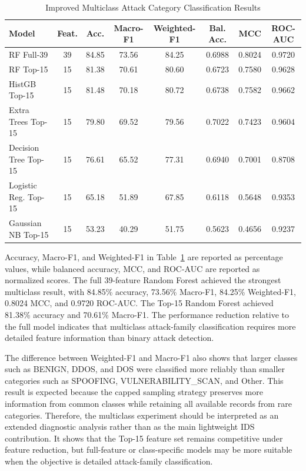 \documentclass[journal]{IEEEtran}
\begin{document}
\begin{table}[htbp]
\caption{Improved Multiclass Attack Category Classification Results}
\label{tab:multiclass_results}
\centering
\scriptsize
\begin{tabular}{lccccccc}
\toprule
\textbf{Model} & \textbf{Feat.} & \textbf{Acc.} & \textbf{Macro-F1} & \textbf{Weighted-F1} & \textbf{Bal. Acc.} & \textbf{MCC} & \textbf{ROC-AUC} \\
\midrule
RF Full-39 & 39 & 84.85 & 73.56 & 84.25 & 0.6988 & 0.8024 & 0.9720 \\
RF Top-15 & 15 & 81.38 & 70.61 & 80.60 & 0.6723 & 0.7580 & 0.9628 \\
HistGB Top-15 & 15 & 81.48 & 70.18 & 80.72 & 0.6738 & 0.7582 & 0.9662 \\
Extra Trees Top-15 & 15 & 79.80 & 69.52 & 79.56 & 0.7022 & 0.7423 & 0.9604 \\
Decision Tree Top-15 & 15 & 76.61 & 65.52 & 77.31 & 0.6940 & 0.7001 & 0.8708 \\
Logistic Reg. Top-15 & 15 & 65.18 & 51.89 & 67.85 & 0.6118 & 0.5648 & 0.9353 \\
Gaussian NB Top-15 & 15 & 53.23 & 40.29 & 51.75 & 0.5623 & 0.4656 & 0.9237 \\
\bottomrule
\end{tabular}
\end{table}

Accuracy, Macro-F1, and Weighted-F1 in Table~\ref{tab:multiclass_results} are reported as percentage values, while balanced accuracy, MCC, and ROC-AUC are reported as normalized scores. The full 39-feature Random Forest achieved the strongest multiclass result, with 84.85\% accuracy, 73.56\% Macro-F1, 84.25\% Weighted-F1, 0.8024 MCC, and 0.9720 ROC-AUC. The Top-15 Random Forest achieved 81.38\% accuracy and 70.61\% Macro-F1. The performance reduction relative to the full model indicates that multiclass attack-family classification requires more detailed feature information than binary attack detection.

The difference between Weighted-F1 and Macro-F1 also shows that larger classes such as BENIGN, DDOS, and DOS were classified more reliably than smaller categories such as SPOOFING, VULNERABILITY\_SCAN, and Other. This result is expected because the capped sampling strategy preserves more information from common classes while retaining all available records from rare categories. Therefore, the multiclass experiment should be interpreted as an extended diagnostic analysis rather than as the main lightweight IDS contribution. It shows that the Top-15 feature set remains competitive under feature reduction, but full-feature or class-specific models may be more suitable when the objective is detailed attack-family classification.
\end{document}
